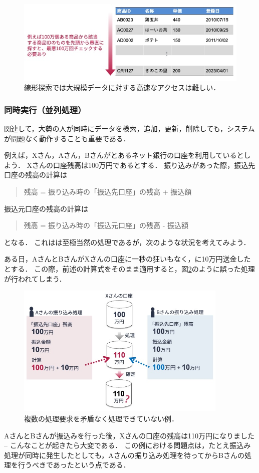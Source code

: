 \begin{figure}[tb]
    \centering
    \includegraphics[width=1.0\textwidth]{figure/linear-search-for-table.jpg}
    \caption{線形探索では大規模データに対する高速なアクセスは難しい．}
    \label{fig:linear-search-for-table}
\end{figure}


\subsubsection{同時実行（並列処理）}
関連して，大勢の人が同時にデータを検索，追加，更新，削除しても，システムが問題なく動作することも重要である．

例えば，Xさん，Aさん，Bさんがとあるネット銀行の口座を利用しているとしよう．
Xさんの口座残高は100万円であるとする．
振り込みがあった際，振込先口座の残高の計算は
\begin{quotation}
残高 = 振り込み時の「振込先口座」の残高 + 振込額
\end{quotation}
振込元口座の残高の計算は
\begin{quotation}
残高 = 振り込み時の「振込元口座」の残高 - 振込額
\end{quotation}
となる．
これはは至極当然の処理であるが，次のような状況を考えてみよう．

ある日，AさんとBさんがXさんの口座に一秒の狂いもなく，に10万円送金したとする．
この際，前述の計算式をそのまま適用すると，図\ref{fig:mutual-exclusion}のように誤った処理が行われてしまう．
\begin{figure}[tb]
    \centering
    \includegraphics[width=0.9\textwidth]{figure/mutual-exclusion.jpg}
    \caption{複数の処理要求を矛盾なく処理できていない例．}
    \label{fig:mutual-exclusion}
\end{figure}
AさんとBさんが振込みを行った後，Xさんの口座の残高は110万円になりました -- こんなことが起きたら大変である．
この例における問題点は，たとえ振込み処理が同時に発生したとしても，Aさんの振り込み処理を待ってからBさんの処理を行うべきであったという点である．

